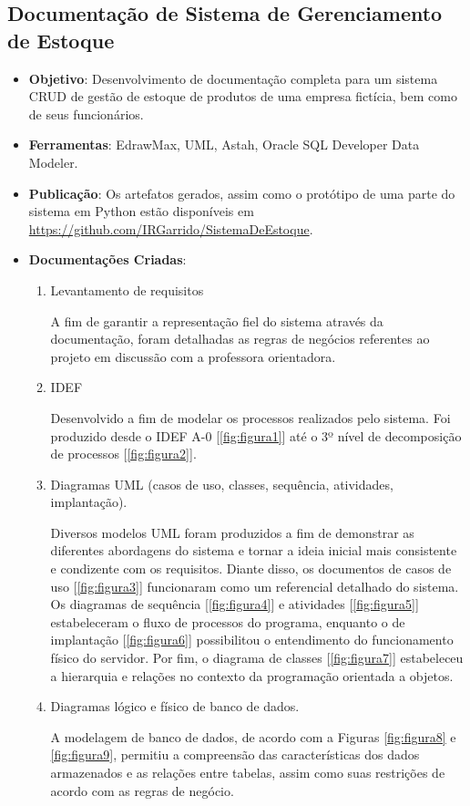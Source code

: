 \documentclass[12pt]{article}
\begin{document}
\subsection*{Documentação de Sistema de Gerenciamento de Estoque}
\begin{itemize}
    \item \textbf{Objetivo}: Desenvolvimento de documentação completa para um sistema CRUD de gestão de estoque de produtos de uma empresa fictícia, bem como de seus funcionários.
    \item \textbf{Ferramentas}: EdrawMax, UML, Astah, Oracle SQL Developer Data Modeler.
    \item \textbf{Publicação}: Os artefatos gerados, assim como o protótipo de uma parte do sistema em Python estão disponíveis em \href{https://github.com/IRGarrido/SistemaDeEstoque}{https://github.com/IRGarrido/SistemaDeEstoque}.
    \item \textbf{Documentações Criadas}:
        \begin{enumerate}
            \item Levantamento de requisitos

                A fim de garantir a representação fiel do sistema através da documentação, foram detalhadas as regras de negócios referentes ao projeto em discussão com a professora orientadora.
                
            \item IDEF
            
                Desenvolvido a fim de modelar os processos realizados pelo sistema. Foi produzido desde o IDEF A-0 [\ref{fig:figura1}] até o 3º nível de decomposição de processos [\ref{fig:figura2}].
                
            \item Diagramas UML (casos de uso, classes, sequência, atividades, implantação).

                Diversos modelos UML foram produzidos a fim de demonstrar as diferentes abordagens do sistema e tornar a ideia inicial mais consistente e condizente com os requisitos. Diante disso, os documentos de casos de uso [\ref{fig:figura3}] funcionaram como um referencial detalhado do sistema. Os diagramas de sequência [\ref{fig:figura4}] e atividades [\ref{fig:figura5}] estabeleceram o fluxo de processos do programa, enquanto o de implantação [\ref{fig:figura6}] possibilitou o entendimento do funcionamento físico do servidor. Por fim, o diagrama de classes [\ref{fig:figura7}] estabeleceu a hierarquia e relações no contexto da programação orientada a objetos.
                
            \item Diagramas lógico e físico de banco de dados.

                A modelagem de banco de dados, de acordo com a Figuras \ref{fig:figura8} e \ref{fig:figura9}, permitiu a compreensão das características dos dados armazenados e as relações entre tabelas, assim como suas restrições de acordo com as regras de negócio.
                
        \end{enumerate}
\end{itemize}
\end{document}
